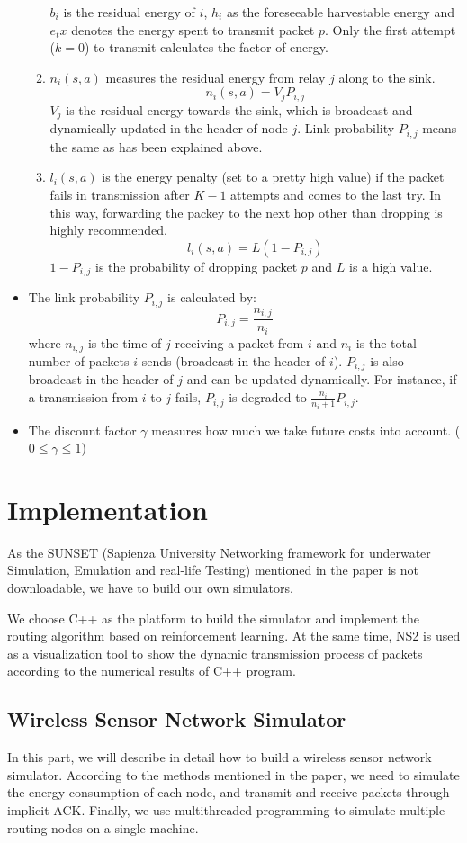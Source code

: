 \documentclass[10pt,twocolumn,letterpaper]{article}
\begin{document}
\begin{itemize}
\begin{enumerate}
		$b_i$ is the residual energy of $i$, $h_i$ as the foreseeable harvestable energy and $e_tx$ denotes the energy spent to transmit packet $p$. Only the first attempt ($k=0$) to transmit calculates the factor of energy.
		\item $n_i(s,a)$ measures the residual energy from relay $j$ along to the sink. 
		$$
		n_i(s,a)=V_jP_{i,j}
		$$
		$V_j$ is the residual energy towards the sink, which is broadcast and dynamically updated in the header of node $j$. Link probability $P_{i,j}$ means the same as has been explained above.
		\item  $l_i(s,a)$ is the energy penalty (set to a pretty high value) if the packet fails in transmission after $K-1$ attempts and comes to the last try. In this way, forwarding the packey to the next hop other than dropping is highly recommended.
		$$
		l_i(s,a)=L(1-P_{i,j})
		$$ 
		$1-P_{i,j}$ is the probability of dropping packet $p$ and $L$ is a high value. 
	\end{enumerate}
	\item The link probability $P_{i,j}$ is calculated by:
	$$
	P_{i,j}=\frac{n_{i,j}}{n_i}
	$$
	where $n_{i,j}$ is the time of $j$ receiving a packet from $i$ and $n_i$ is the total number of packets $i$ sends (broadcast in the header of $i$). $P_{i,j}$ is also broadcast in the header of $j$ and can be updated dynamically. For instance, if a transmission from $i$ to $j$ fails, $P_{i,j}$ is degraded to $\frac{n_i}{n_i+1}P_{i,j}$. 
	\item The discount factor $\gamma$ measures how much we take future costs into account. ($0\leq \gamma\leq 1$)
\end{itemize}

\section{Implementation}
	As the SUNSET (Sapienza University Networking framework for underwater Simulation, Emulation and real-life Testing) mentioned in the paper is not downloadable, we have to build our own simulators.
	
	We choose C++ as the platform to build the simulator and implement the routing algorithm based on reinforcement learning. At the same time, NS2 is used as a visualization tool to show the dynamic transmission process of packets according to the numerical results of C++ program.
\subsection{Wireless Sensor Network Simulator}
	In this part, we will describe in detail how to build a wireless sensor network simulator. According to the methods mentioned in the paper, we need to simulate the energy consumption of each node, and transmit and receive packets through implicit ACK. Finally, we use multithreaded programming to simulate multiple routing nodes on a single machine.
		
\end{document}
